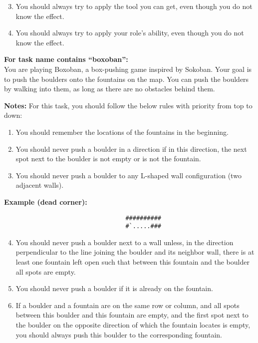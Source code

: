 \begin{MyGreenBox}[frametitle={\textbf{Iteration 1 MiniHack Prompt}}]
\begin{enumerate}\setcounter{enumi}{2}
  \item You should always try to apply the tool you can get, even though you do not know the effect.
  \item You should always try to apply your role's ability, even though you do not know the effect.
\end{enumerate}

\textbf{For task name contains “boxoban”:}\\
You are playing Boxoban, a box-pushing game inspired by Sokoban. Your goal is to push the boulders onto the fountains on the map. You can push the boulders by walking into them, as long as there are no obstacles behind them.

\textbf{Notes:}
For this task, you should follow the below rules with priority from top to down:
\begin{enumerate}
  \item You should remember the locations of the fountains in the beginning.
  \item You should never push a boulder in a direction if in this direction, the next spot next to the boulder is not empty or is not the fountain.
  \item You should never push a boulder to any L-shaped wall configuration (two adjacent walls).
\end{enumerate}

\textbf{Example (dead corner):}
\begin{verbatim}
                                  ##########
                                  #`.....###
\end{verbatim}

\begin{enumerate}\setcounter{enumi}{3}
  \item You should never push a boulder next to a wall unless, in the direction perpendicular to the line joining the boulder and its neighbor wall, there is at least one fountain left open such that between this fountain and the boulder all spots are empty.
  \item You should never push a boulder if it is already on the fountain.
  \item If a boulder and a fountain are on the same row or column, and all spots between this boulder and this fountain are empty, and the first spot next to the boulder on the opposite direction of which the fountain locates is empty, you should always push this boulder to the corresponding fountain.
\end{enumerate}


\end{MyGreenBox}
